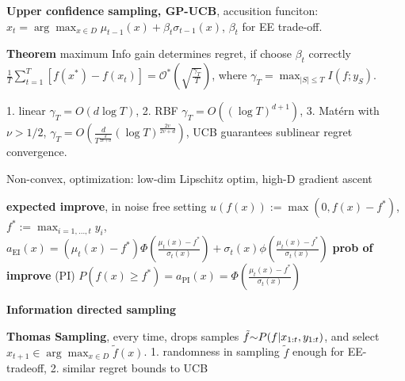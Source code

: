 \textbf{Upper confidence sampling, GP-UCB}, accusition funciton: $x_t=\arg \max _{x \in D} \mu_{t-1}(x)+\beta_t \sigma_{t-1}(x)$, $\beta_t$ for EE trade-off.


\textbf{Theorem} maximum Info gain determines regret, if choose $\beta_t$ correctly $\frac{1}{T} \sum_{t=1}^T[f(x^*)-f(x_t)]=\mathcal{O}^*(\sqrt{\frac{\gamma_T}{T}})$, where $\gamma_T=\max _{|S| \leq T} I(f ; y_S)$.

1. linear $\gamma_T=O(d \log T)$, 2. RBF $\gamma_T=O((\log T)^{d+1})$, 3. Matérn with $\nu>1/2$, $\gamma_T=O(\frac{d}{T^{\frac{d}{2 v+d}}}(\log T)^{\frac{2 v}{2 v+d}})$, UCB guarantees sublinear regret convergence.

Non-convex, optimization: low-dim Lipschitz optim, high-D gradient ascent


\textbf{expected improve}, in noise free setting  $u(f(x)):=\max (0, f(x)-f^*)$, $f^*:=\max _{i=1, \ldots, t} y_i$, $a_{\mathrm{EI}}(x)=(\mu_t(x)-f^*) \Phi(\frac{\mu_t(x)-f^*}{\sigma_t(x)})+\sigma_t(x) \phi(\frac{\mu_t(x)-f^*}{\sigma_t(x)})$
\textbf{prob of improve} (PI) $P(f(x) \geq f^*)=a_{\mathrm{PI}}(x)=\Phi(\frac{\mu_t(x)-f^*}{\sigma_t(x)})$

\textbf{Information directed sampling}
    
\textbf{Thomas Sampling}, every time, drops samples $\tilde{f} {\small \sim} P(f | x_{1: t}, y_{1: t})$, and select $x_{t+1} \in \arg \max _{x \in D} \tilde{f}(x)$. 1. randomness in sampling $\tilde{f}$ enough for EE-tradeoff, 2. similar regret bounds to UCB
